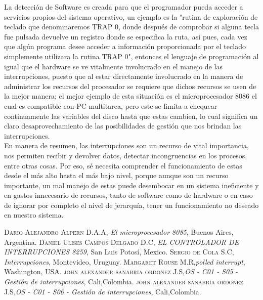\documentclass{article}
\begin{document}
La detección de Software es creada para que el programador pueda acceder a servicios propios del sistema operativo, un ejemplo es la \cite{Ser} "rutina de exploración de teclado que denominaremos TRAP 0, donde después de comprobar si alguna tecla fue pulsada devuelve un registro donde se especifica la ruta, así pues, cada vez que algún programa desee acceder a información proporcionada por el teclado simplemente utilizara la rutina TRAP 0", entonces el lenguaje de programación al igual que el hardware se ve vitalmente involucrado en el manejo de las interrupciones, puesto que al  estar directamente involucrado en la manera de administrar los recursos del procesador se requiere que dichos recursos se usen de la mejor manera; el mejor ejemplo de esta situación es el \cite{Dan}microprocesador 8086 el cual es compatible con PC multitarea, pero este se limita a chequear continuamente las variables del disco hasta que estas cambien, lo cual significa un claro desaprovechamiento  de las posibilidades de gestión que nos brindan las interrupciones.\\

En manera de resumen, las interrupciones son un recurso de vital importancia, nos permiten recibir y devolver datos, detectar incongruencias en los procesos, entre otras cosas. Por eso, sé necesita comprender el funcionamiento de estas desde el más alto hasta el más bajo nivel, porque aunque son un recurso importante, un mal manejo de estas puede desembocar en un sistema ineficiente y en gastos innecesario de recursos, tanto de software como de hardware o en caso de ignorar por completo el nivel de jerarquía, tener un funcionamiento no deseado en nuestro sistema.\\



\newpage


\begin{thebibliography}{X}
 \textsc{Dario Alejandro Alpern D.A.A},
\textit{El microprocesador 8085}, Buenos Aires, Argentina.
 \textsc{Daniel Ulises Campos Delgado D.C},
\textit{ EL CONTROLADOR DE INTERRUPCIONES 8259}, San Luis Potosí, Mexico.
 \textsc{Sergio de Cola S.C},\textit{ Interrupciones}, Montevideo, Uruguay.
 \textsc{Margaret Rouse M.R},\textit{polled interrupt}, Washington, USA.
 \textsc{john alexander sanabria ordonez J.S},\textit{OS - C01 - S05 - Gestión de interrupciones}, Cali,Colombia.
 \textsc{john alexander sanabria ordonez J.S},\textit{OS - C01 - S06 - Gestión de interrupciones}, Cali,Colombia.

\end{thebibliography}
\end{document}
